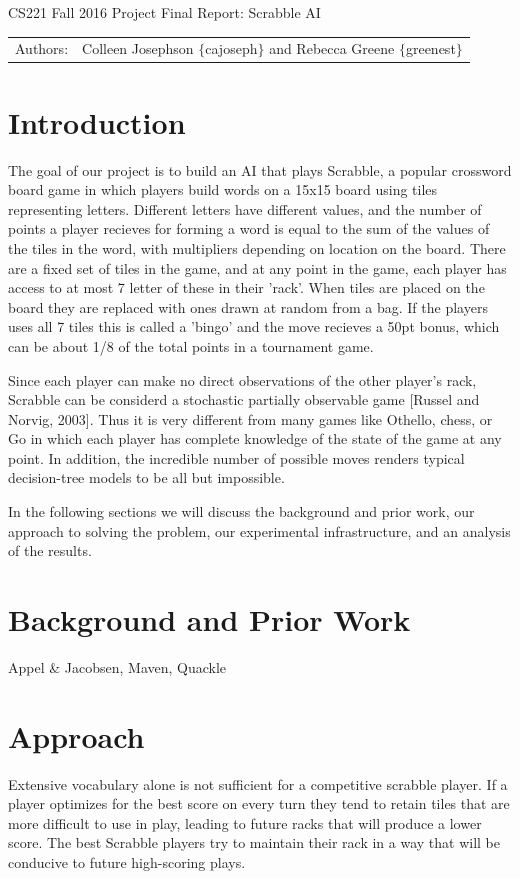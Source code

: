 \documentclass[12pt]{article}
\begin{document}
\begin{center}
{\Large CS221 Fall 2016 Project Final Report: Scrabble AI}

\begin{tabular}{rl}
  Authors: & Colleen Josephson $\{$cajoseph$\}$ and Rebecca Greene $\{$greenest$\}$\\
\end{tabular}
\end{center}


\section*{Introduction}
The goal of our project is to build an AI that plays Scrabble, a
popular crossword board game in which players build words on a 15x15
board using tiles representing letters. Different letters have
different values, and the number of points a player recieves for
forming a word is equal to the sum of the values of the tiles in the
word, with multipliers depending on location on the board. There are a
fixed set of tiles in the game, and at any point in the game, each
player has access to at most 7 letter of these in their 'rack'.  When
tiles are placed on the board they are replaced with ones drawn at
random from a bag. If the players uses all 7 tiles this is called a
'bingo' and the move recieves a 50pt bonus, which can be about 1/8 of
the total points in a tournament game.

Since each player can make no direct observations of the other
player's rack, Scrabble can be considerd a stochastic partially
observable game [Russel and Norvig, 2003]. Thus it is very different
from many games like Othello, chess, or Go in which each player has
complete knowledge of the state of the game at any point. In addition,
the incredible number of possible moves renders typical decision-tree
models to be all but impossible.

In the following sections we will discuss the background and prior
work, our approach to solving the problem, our experimental
infrastructure, and an analysis of the results.

\section*{Background and Prior Work}
Appel & Jacobsen, Maven, Quackle

\section*{Approach}
Extensive vocabulary alone is not sufficient for a competitive
scrabble player. If a player optimizes for the best score on every
turn they tend to retain tiles that are more difficult to use in play,
leading to future racks that will produce a lower score. The best
Scrabble players try to maintain their rack in a way that will be
conducive to future high-scoring plays.
\end{document}
